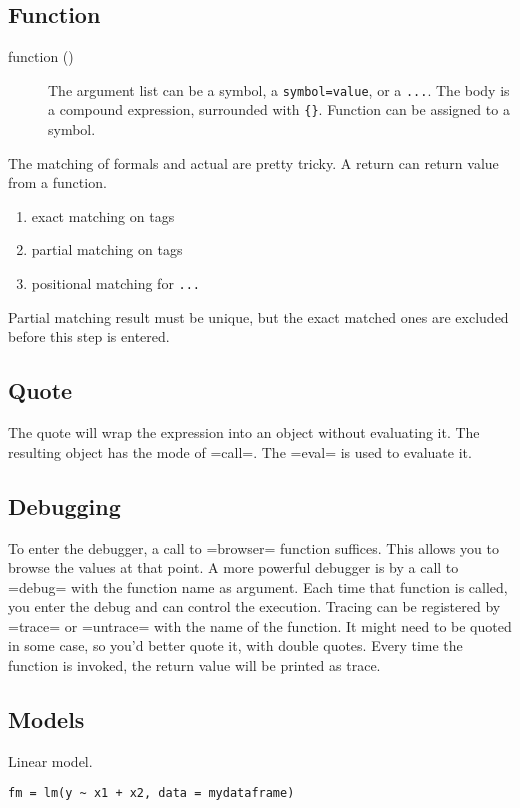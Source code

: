 \subsection{Function}
\begin{description}
\item [function () ] The argument list can be a
  symbol, a \texttt{symbol=value}, or a \texttt{...}.  The body is a
  compound expression, surrounded with \verb${}$.  Function can be
  assigned to a symbol.
\end{description}

The matching of formals and actual are pretty tricky.
A return can return value from a function.
\begin{enumerate}
\item exact matching on tags
\item partial matching on tags
\item positional matching for \texttt{...}
\end{enumerate}
Partial matching result must be unique, but the exact matched ones are
excluded before this step is entered.

\subsection{Quote}
The quote will wrap the expression into an object without evaluating it.
The resulting object has the mode of =call=.
The =eval= is used to evaluate it.
\subsection{Debugging}
To enter the debugger, a call to =browser= function suffices.
This allows you to browse the values at that point.
A more powerful debugger is by a call to =debug= with the function name as argument.
Each time that function is called, you enter the debug and can control the execution.
Tracing can be registered by =trace= or =untrace= with the name of the function.
It might need to be quoted in some case, so you'd better quote it, with double quotes.
Every time the function is invoked, the return value will be printed as trace.

\subsection{Models}
Linear model.

\begin{lstlisting}
fm = lm(y ~ x1 + x2, data = mydataframe)
\end{lstlisting}

